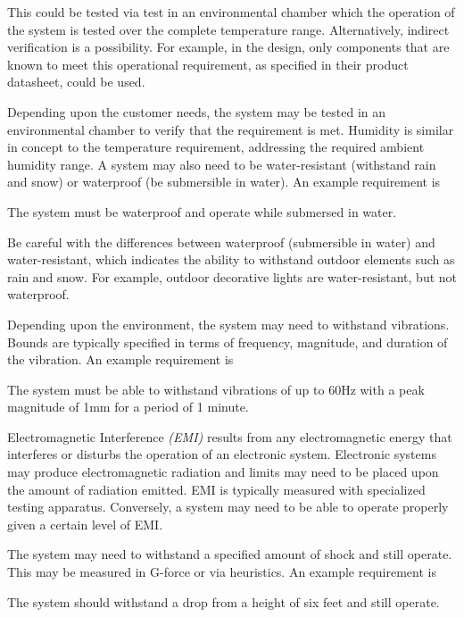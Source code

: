 This could be tested via test in an environmental chamber which the
operation of the system is tested over the complete temperature range.
Alternatively, indirect verification is a possibility. For example, in
the design, only components that are known to meet this operational
requirement, as specified in their product datasheet, could be used.


Depending upon the customer needs, the system may be tested in an
environmental chamber to verify that the requirement is met. Humidity is
similar in concept to the temperature requirement, addressing the
required ambient humidity range. A system may also need to be
water-resistant (withstand rain and snow) or waterproof (be submersible
in water). An example requirement is

\begin{itquote}
The system must be waterproof and operate while submersed in water.
\end{itquote}

Be careful with the differences between waterproof (submersible in
water) and water-resistant, which indicates the ability to withstand
outdoor elements such as rain and snow. For example, outdoor decorative
lights are water-resistant, but not waterproof.


Depending upon the environment, the system may need to withstand
vibrations. Bounds are typically specified in terms of frequency,
magnitude, and duration of the vibration. An example requirement is

\begin{itquote}
The system must be able to withstand vibrations of up to 60Hz with a
peak magnitude of 1mm for a period of 1 minute.
\end{itquote}

Electromagnetic Interference \emph{(EMI)} results from any
electromagnetic energy that interferes or disturbs the operation of an
electronic system. Electronic systems may produce electromagnetic
radiation and limits may need to be placed upon the amount of radiation
emitted. EMI is typically measured with specialized testing apparatus.
Conversely, a system may need to be able to operate properly given a
certain level of EMI.

The system may need to withstand a specified amount of shock and still
operate. This may be measured in G-force or via heuristics. An example
requirement is

\begin{itquote}
The system should withstand a drop from a height of six feet and still
operate.
\end{itquote}

